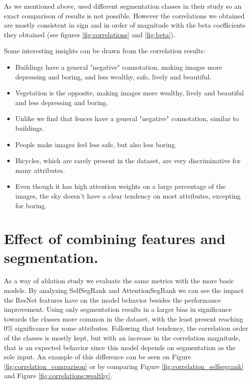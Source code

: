 As we mentioned above,  used different segmentation classes
in their study so an exact comparison of results is not possible. However the correlations we obtained
are mostly consistent in sign and in order of magnitude with the beta coefficients they
obtained (see figures \ref{fig:correlations} and \ref{fig:beta}).

Some interesting insights can be drawn from the correlation results:

\begin{itemize}
	\item Buildings have a general "negative" connotation, making images more depressing and
	boring, and less wealthy, safe, lively and beautiful.
	\item Vegetation is the opposite, making images more wealthy, lively and beautiful and less
	depressing and boring.
	\item Unlike \cite{rossetti} we find that fences have a general "negative" connotation,
	similar to buildings.
	\item People make images feel less safe, but also less boring.
	\item Bicycles, which are rarely present in the dataset, are very discriminative for
	many attributes.
	\item Even though it has high attention weights on a large percentage of the images, the sky doesn't have
	a clear tendency on most attributes, excepting for boring.
\end{itemize}

\section{Effect of combining features and segmentation.}
\label{sec:combining}

As a way of ablation study we evaluate the same metrics with the more basic models.
By analyzing SelfSegRank and AttentionSegRank we can see the impact the ResNet features have on the model  behavior
besides the performance improvement.
Using only segmentation results in a larger bias in significance towards the classes more
common in the dataset, with the least present reaching 0\% significance for some attributes.
Following that tendency, the correlation order of the classes is mostly kept, but with an
increase in the correlation magnitude, that is an expected behavior since this model depends on segmentation as
the sole input. An example of this difference can be seen on Figure \ref{fig:correlation_comparison}  or
by comparing Figure \ref{fig:correlation_selfsegrank} and Figure \ref{fig:correlations:wealthy}.

